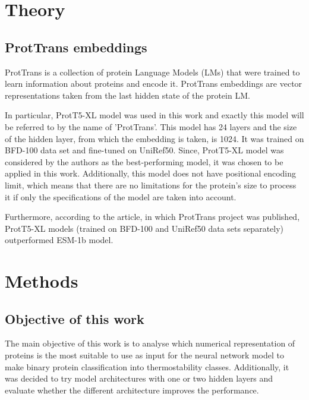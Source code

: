 \documentclass[12pt]{article}
\begin{document}
	\section{Theory}

	\subsection{ProtTrans embeddings}

	ProtTrans is a collection of protein Language Models 
	(LMs) that were trained to learn information about 
	proteins and encode it. ProtTrans embeddings are vector 
	representations taken from the last hidden state of 
	the protein LM. 

	In particular, ProtT5-XL model was used in this work and 
	exactly this model will be referred to by the name of 
	'ProtTrans'. This model has 24 layers 
	and the size of the hidden layer, from which the 
	embedding is taken, is 1024. It was trained on 
	BFD-100 data set 
	and fine-tuned on UniRef50. Since, ProtT5-XL model was 
	considered by the 
	authors as the best-performing model, it was chosen to be 
	applied in this work. Additionally, this model 
	does not have 
	positional encoding limit, which means that there are 
	no limitations for the protein's size to process it 
	if only the specifications of the model are taken into 
	account. 

	Furthermore, according to the article, in which ProtTrans
	project was published, ProtT5-XL models (trained on BFD-100 
	and UniRef50 data sets separately) outperformed ESM-1b model.
	
	

	\newpage

	\section{Methods}

	\subsection{Objective of this work}

	The main objective of this work is to analyse 
	which numerical representation of proteins is the most 
	suitable to use as input for the neural network 
	model to make binary protein classification into thermostability
	classes. Additionally, it was decided to try model 
	architectures with one or two hidden layers and evaluate 
	whether the different architecture improves the 
	performance.
\end{document}
